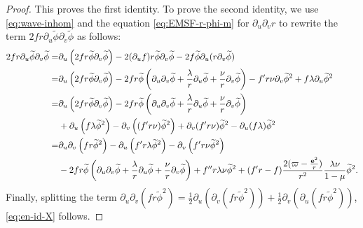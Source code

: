 \documentclass[10pt, reqno]{amsart}
\theoremstyle{definition}
\theoremstyle{remark}
\theoremstyle{conjecture}
\numberwithin{equation}{section}
\newcommand{\rd}{\partial}
\newcommand{\0}{\emptyset}
\newcommand{\lmb}{\lambda}
\newcommand{\bfe}{{\bf e}}
\newcommand{\dur}{\nu}
\newcommand{\dvr}{\lmb}
\newcommand{\e}{\bfe}							%
\newcommand{\phibg}{\overline{\phi}}				%
\newcommand{\phidf}{\widetilde{\phi}}				%
\begin{document}
\begin{proof}
This proves the first identity. To prove the second identity, we use \eqref{eq:wave-inhom} and the equation \eqref{eq:EMSF-r-phi-m} for $\rd_{u} \rd_{v} r$ to rewrite the term $2 f r \rd_{u} \phidf \rd_{v} \phidf$ as follows:
\begin{equation} \label{eq:morawetz-pf}
\begin{aligned}
2 f r \rd_{u} \phidf \rd_{v} \phidf
 = & 	\rd_{u} \left(2 f r \phidf \rd_{v} \phidf\right)
 	- 2 (\rd_{u} f) r \phidf \rd_{v} \phidf - 2 f \phidf \rd_{u} (r \rd_{v} \phidf) \\
 = & 	\rd_{u} \left(2 f r \phidf \rd_{v} \phidf\right)
 	- 2 f r \phidf \left(\rd_{u} \rd_{v} \phidf + \frac{\dvr}{r} \rd_{u} \phidf  + \frac{\dur}{r} \rd_{v} \phidf \right)
	- f' r \dur  \rd_{v} \phidf^{2} + f \dvr \rd_{u} \phidf^{2} \\
 = & 	\rd_{u} \left( 2 f r \phidf \rd_{v} \phidf\right) 
 	- 2 f r \phidf \left(\rd_{u} \rd_{v} \phidf + \frac{\dvr}{r} \rd_{u} \phidf  + \frac{\dur}{r} \rd_{v} \phidf \right) 	 \\
&	+ \rd_{u} \left(f \dvr \phidf^{2} \right)
	- \rd_{v} \left((f' r \dur) \phidf^{2} \right) 
	+ \rd_{v} (f' r \dur)  \phidf^{2} 
	- \rd_{u}(f \dvr) \phidf^{2} \\
 = & 	\rd_{u} \rd_{v} \left( f r \phidf^{2} \right)
 	- \rd_{u} \left( f' r \dvr \phidf^{2} \right) - \rd_{v} \left(f' r \dur \phidf^{2} \right) \\
&	- 2 f r \phidf \left(\rd_{u} \rd_{v} \phidf + \frac{\dvr}{r} \rd_{u} \phidf  + \frac{\dur}{r} \rd_{v} \phidf \right) 
	+ f'' r \dvr \dur \phidf^{2} + (f' r - f) \frac{2 (\varpi - \frac{\e^{2}}{r})}{r^{2}} \frac{\dvr \dur}{1-\mu} \phidf^{2} .
\end{aligned}
\end{equation}
Finally, splitting the term
$\rd_{u} \rd_{v} ( f r \phidf^{2} ) = \frac{1}{2} \rd_{u} (\rd_{v} (f r \phidf^{2})) + \frac{1}{2} \rd_{v} (\rd_{u} (f r \phidf^{2}))$,  \eqref{eq:en-id-X} follows. \qedhere
\end{proof}
\end{document}

